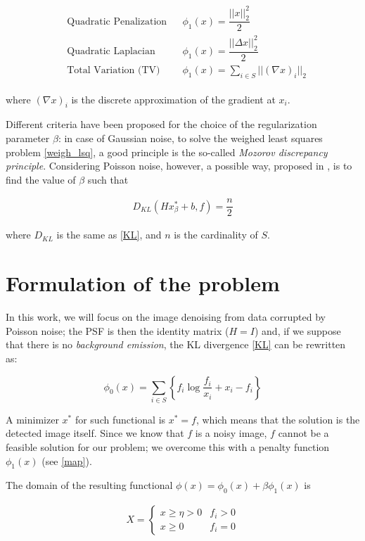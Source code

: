 \begin{align}
\label{defTV}
\begin{aligned}
&\mbox{Quadratic Penalization} && \phi_1(x) = \dfrac{||x||_2^2}{2} \\
&\mbox{Quadratic Laplacian} && \phi_1(x) = \dfrac{||\Delta x||_2^2}{2} \\
&\mbox{Total Variation (TV)} && \phi_1(x) = \sum_{i \in S} ||(\nabla x)_i||_2
\end{aligned}
\end{align}

where $(\nabla x)_i$ is the discrete approximation of the gradient at $x_i$.

Different criteria have been proposed for the choice of the regularization parameter $\beta$: in case of Gaussian noise, to solve the weighed least squares problem \eqref{weigh_lsq}, a good principle is the so-called \emph{Mozorov discrepancy principle}\citep{mozorov}. Considering Poisson noise, however, a possible way, proposed in \citep{discr_princ}, is to find the value of $\beta$ such that

\begin{align}
\label{discr}
D_{KL} (Hx_\beta^*+b,f) = \dfrac{n}{2}
\end{align}

where $D_{KL}$ is the same as \eqref{KL}, and $n$ is the cardinality of $S$.

\section{Formulation of the problem}

In this work, we will focus on the image denoising from data corrupted by Poisson noise; the PSF is then the identity matrix ($H=I$) and, if we suppose that there is no \emph{background emission}, the KL divergence \eqref{KL} can be rewritten as:

$$\phi_0(x) = \sum_{i \in S} \left\{f_i \log{\dfrac{f_i}{x_i}} + x_i - f_i \right\}$$

A minimizer $x^*$ for such functional is $x^* = f$, which means that the solution is the detected image itself. Since we know that $f$ is a noisy image, $f$ cannot be a feasible solution for our problem; we overcome this with a penalty function $\phi_1(x)$ (see \eqref{map}).

The domain of the resulting functional $\phi(x) = \phi_0(x)  + \beta \phi_1(x) $ is

\begin{align}
\label{domain}
X = \left\{ \begin{array}{ll}
x \geq \eta > 0&f_i > 0 \\
x \geq 0&f_i=0
\end{array}\right.
\end{align}


